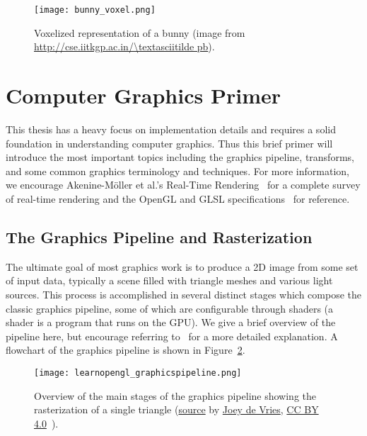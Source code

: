 
\begin{figure}[h]
\centering
\texttt{[image: bunny\_voxel.png]}
\caption{Voxelized representation of a bunny (image from \url{http://cse.iitkgp.ac.in/\textasciitilde pb}).}
\label{fig:bunnyvoxel}
\end{figure}

\section{Computer Graphics Primer}
This thesis has a heavy focus on implementation details and requires a solid foundation in understanding computer graphics. Thus this brief primer will introduce the most important topics including the graphics pipeline, transforms, and some common graphics terminology and techniques. For more information, we encourage Akenine-M{\"o}ller et al.'s Real-Time Rendering~\cite{moller2008rtr} for a complete survey of real-time rendering and the OpenGL and GLSL specifications~\cite{opengl45spec,glsl45spec} for reference.

\subsection{The Graphics Pipeline and Rasterization}
The ultimate goal of most graphics work is to produce a 2D image from some set of input data, typically a scene filled with triangle meshes and various light sources. This process is accomplished in several distinct stages which compose the classic graphics pipeline, some of which are configurable through shaders (a shader is a program that runs on the GPU). We give a brief overview of the pipeline here, but encourage referring to~\cite{moller2008rtr} for a more detailed explanation. A flowchart of the graphics pipeline is shown in Figure~\ref{fig:pipeline}.

\begin{figure}[h]
\centering
\texttt{[image: learnopengl\_graphicspipeline.png]}
\caption{Overview of the main stages of the graphics pipeline showing the rasterization of a single triangle (\href{https://learnopengl.com/img/getting-started/pipeline.png}{source} by \href{https://twitter.com/JoeyDeVriez}{Joey de Vries}, \href{https://creativecommons.org/licenses/by/4.0/}{CC BY 4.0}~\cite{learnopengl}).}
\label{fig:pipeline}
\end{figure}


